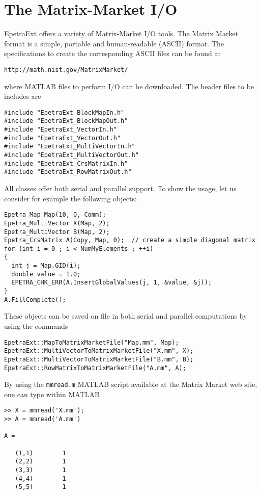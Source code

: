 \documentclass[11pt,relax]{SANDreport}
\begin{document}
\section{The Matrix-Market I/O}
\label{sec:mm}

EpetraExt offers a variety of Matrix-Market I/O tools.
The Matrix Market format is a simple, portable and human-readable (ASCII) 
format. The
specifications to create the corresponding ASCII files can be found at
\begin{verbatim}
http://math.nist.gov/MatrixMarket/
\end{verbatim}
where MATLAB files to perform I/O can be downloaded. 
The header files to be includes are
\begin{verbatim}
#include "EpetraExt_BlockMapIn.h"
#include "EpetraExt_BlockMapOut.h"
#include "EpetraExt_VectorIn.h"
#include "EpetraExt_VectorOut.h"
#include "EpetraExt_MultiVectorIn.h"
#include "EpetraExt_MultiVectorOut.h"
#include "EpetraExt_CrsMatrixIn.h"
#include "EpetraExt_RowMatrixOut.h"
\end{verbatim}
All classes offer both serial and parallel support.
To show the usage, let us consider for example the following objects:
\begin{verbatim}
Epetra_Map Map(10, 0, Comm);
Epetra_MultiVector X(Map, 2);
Epetra_MultiVector B(Map, 2);
Epetra_CrsMatrix A(Copy, Map, 0);  // create a simple diagonal matrix  
for (int i = 0 ; i < NumMyElements ; ++i)  
{
  int j = Map.GID(i);
  double value = 1.0;    
  EPETRA_CHK_ERR(A.InsertGlobalValues(j, 1, &value, &j));
}
A.FillComplete();
\end{verbatim}
These objects can be saved on file
in both serial and parallel computations by using the commands
\begin{verbatim}
EpetraExt::MapToMatrixMarketFile("Map.mm", Map);
EpetraExt::MultiVectorToMatrixMarketFile("X.mm", X);
EpetraExt::MultiVectorToMatrixMarketFile("B.mm", B);
EpetraExt::RowMatrixToMatrixMarketFile("A.mm", A);
\end{verbatim}
By using the \verb!mmread.m! MATLAB
script available at the Matrix Market web site, one can type within MATLAB
\begin{verbatim}
>> X = mmread('X.mm');
>> A = mmread('A.mm')                                       

A =

   (1,1)        1
   (2,2)        1
   (3,3)        1
   (4,4)        1
   (5,5)        1
\end{verbatim}
\end{document}
